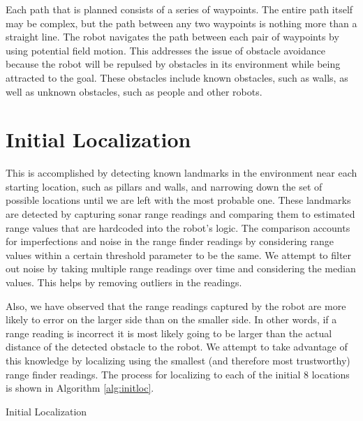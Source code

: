 \documentclass[11pt]{article}
\begin{document}
Each path that is planned consists of a series of waypoints. The entire path itself may be complex, but the path between any two waypoints is nothing more than a straight line. The robot navigates the path between each pair of waypoints by using potential field motion. This addresses the issue of obstacle avoidance because the robot will be repulsed by obstacles in its environment while being attracted to the goal. These obstacles include known obstacles, such as walls, as well as unknown obstacles, such as people and other robots.


\section{Initial Localization}

This is accomplished by detecting known landmarks in the environment near each starting location, such as pillars and walls, and narrowing down the set of possible locations until we are left with the most probable one. These landmarks are detected by capturing sonar range readings and comparing them to estimated range values that are hardcoded into the robot's logic. The comparison accounts for imperfections and noise in the range finder readings by considering range values within a certain threshold parameter to be the same. We attempt to filter out noise by taking multiple range readings over time and considering the median values. This helps by removing outliers in the readings. 

Also, we have observed that the range readings captured by the robot are more likely to error on the larger side than on the smaller side. In other words, if a range reading is incorrect it is most likely going to be larger than the actual distance of the detected obstacle to the robot. We attempt to take advantage of this knowledge by localizing using the smallest (and therefore most trustworthy) range finder readings. The process for localizing to each of the initial 8 locations is shown in Algorithm \ref{alg:initloc}. \\

\begin{algorithm}[H]
\caption{Initial Localization}
\label{alg:initloc}
\begin{algorithmic}[1]

\ELSE 
	\ELSE
			\ELSE
			\ENDIF
		\ELSE
			\ELSE
				\ELSE 
				\ENDIF
			\ENDIF
		\ENDIF
	\ENDIF
\ENDIF

\end{algorithmic}
\end{algorithm}
\end{document}
